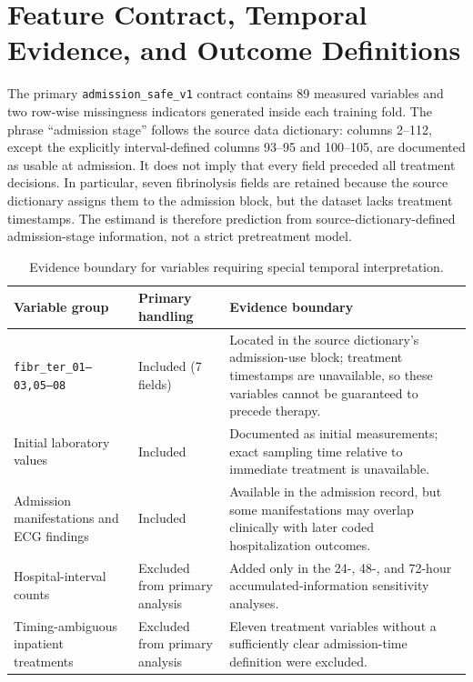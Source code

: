 \appendices

\section{Feature Contract, Temporal Evidence, and Outcome Definitions}
\label{app:features}

The primary \texttt{admission\_safe\_v1} contract contains 89 measured variables and two row-wise missingness indicators generated inside each training fold. The phrase ``admission stage'' follows the source data dictionary: columns 2--112, except the explicitly interval-defined columns 93--95 and 100--105, are documented as usable at admission. It does not imply that every field preceded all treatment decisions. In particular, seven fibrinolysis fields are retained because the source dictionary assigns them to the admission block, but the dataset lacks treatment timestamps. The estimand is therefore prediction from source-dictionary-defined admission-stage information, not a strict pretreatment model.

\begin{table}[ht]
\centering
\caption{Evidence boundary for variables requiring special temporal interpretation.}
\label{tab:app_temporal_evidence}
\small
\begin{tabular}{p{}p{}p{}}
\toprule
Variable group & Primary handling & Evidence boundary \\
\midrule
\texttt{fibr\_ter\_01--03,05--08} & Included (7 fields) & Located in the source dictionary's admission-use block; treatment timestamps are unavailable, so these variables cannot be guaranteed to precede therapy. \\
Initial laboratory values & Included & Documented as initial measurements; exact sampling time relative to immediate treatment is unavailable. \\
Admission manifestations and ECG findings & Included & Available in the admission record, but some manifestations may overlap clinically with later coded hospitalization outcomes. \\
Hospital-interval counts & Excluded from primary analysis & Added only in the 24-, 48-, and 72-hour accumulated-information sensitivity analyses. \\
Timing-ambiguous inpatient treatments & Excluded from primary analysis & Eleven treatment variables without a sufficiently clear admission-time definition were excluded. \\
\bottomrule
\end{tabular}
\end{table}

